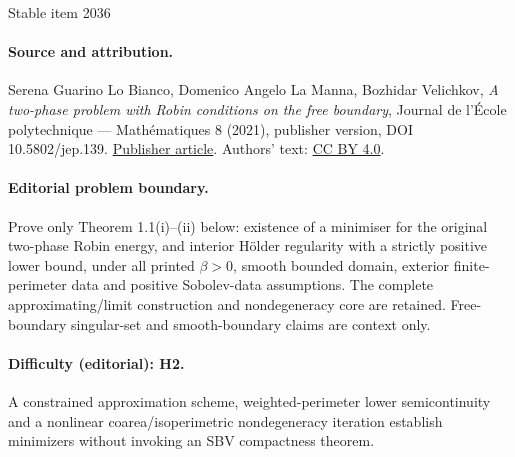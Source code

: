 \documentclass[11pt]{article}
\numberwithin{equation}{section}
\begin{document}
\begin{center}{\Large Stable item 2036}\end{center}
\paragraph{Source and attribution.}
Serena Guarino Lo Bianco, Domenico Angelo La Manna, Bozhidar Velichkov, \emph{A two-phase problem with Robin conditions on the free boundary}, Journal de l’École polytechnique — Mathématiques 8 (2021), publisher version, DOI 10.5802/jep.139. \href{https://jep.centre-mersenne.org/articles/10.5802/jep.139/}{Publisher article}. Authors' text: \href{https://creativecommons.org/licenses/by/4.0/}{CC BY 4.0}.
\paragraph{Editorial problem boundary.}
Prove only Theorem 1.1(i)--(ii) below: existence of a minimiser for the original two-phase Robin energy, and interior Hölder regularity with a strictly positive lower bound, under all printed \(\beta>0\), smooth bounded domain, exterior finite-perimeter data and positive Sobolev-data assumptions. The complete approximating/limit construction and nondegeneracy core are retained. Free-boundary singular-set and smooth-boundary claims are context only.
\paragraph{Difficulty (editorial): H2.}
A constrained approximation scheme, weighted-perimeter lower semicontinuity and a nonlinear coarea/isoperimetric nondegeneracy iteration establish minimizers without invoking an SBV compactness theorem.
\end{document}
